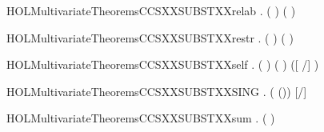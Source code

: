 \newcommand{\HOLMultivariateTheoremsCCSXXSUBSTXXreduce}{\UseVerbatim{HOLMultivariateTheoremsCCSXXSUBSTXXreduce}}
\begin{SaveVerbatim}{HOLMultivariateTheoremsCCSXXSUBSTXXrelab}
\HOLTokenTurnstile{} \HOLSymConst{\HOLTokenForall{}}  .
         (  ) \HOLSymConst{=}  (  ) 
\end{SaveVerbatim}
\newcommand{\HOLMultivariateTheoremsCCSXXSUBSTXXrelab}{\UseVerbatim{HOLMultivariateTheoremsCCSXXSUBSTXXrelab}}
\begin{SaveVerbatim}{HOLMultivariateTheoremsCCSXXSUBSTXXrestr}
\HOLTokenTurnstile{} \HOLSymConst{\HOLTokenForall{}}  .   (\HOLConst{\ensuremath{\nu}}  ) \HOLSymConst{=} \HOLConst{\ensuremath{\nu}}  (  )
\end{SaveVerbatim}
\newcommand{\HOLMultivariateTheoremsCCSXXSUBSTXXrestr}{\UseVerbatim{HOLMultivariateTheoremsCCSXXSUBSTXXrestr}}
\begin{SaveVerbatim}{HOLMultivariateTheoremsCCSXXSUBSTXXself}
\HOLTokenTurnstile{} \HOLSymConst{\HOLTokenForall{}} .
         \HOLSymConst{\HOLTokenConj{}}  ( ) ( ) \HOLSymConst{\HOLTokenImp{}}
       ([  /]  \HOLSymConst{=} )
\end{SaveVerbatim}
\newcommand{\HOLMultivariateTheoremsCCSXXSUBSTXXself}{\UseVerbatim{HOLMultivariateTheoremsCCSXXSUBSTXXself}}
\begin{SaveVerbatim}{HOLMultivariateTheoremsCCSXXSUBSTXXSING}
\HOLTokenTurnstile{} \HOLSymConst{\HOLTokenForall{}}  .  ( \HOLSymConst{|+} (\HOLSymConst{,}))  \HOLSymConst{=} [/] 
\end{SaveVerbatim}
\newcommand{\HOLMultivariateTheoremsCCSXXSUBSTXXSING}{\UseVerbatim{HOLMultivariateTheoremsCCSXXSUBSTXXSING}}
\begin{SaveVerbatim}{HOLMultivariateTheoremsCCSXXSUBSTXXsum}
\HOLTokenTurnstile{} \HOLSymConst{\HOLTokenForall{}}  .
         ( \HOLSymConst{\ensuremath{+}} ) \HOLSymConst{=}
          \HOLSymConst{\ensuremath{+}}   
\end{SaveVerbatim}

